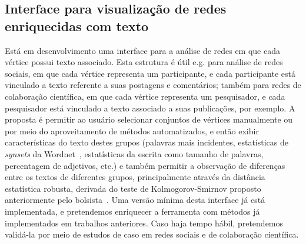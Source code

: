 \documentclass[a4paper, 11pt]{article}
\begin{document}
\subsection{Interface para visualização de redes enriquecidas com texto}
Está em desenvolvimento uma interface para a análise de redes em que cada vértice possui texto associado.
Esta estrutura é útil e.g. para análise de redes sociais, em que cada vértice representa um participante, e cada participante está vinculado a texto referente a suas postagens e comentários;
também para redes de colaboração científica, em que cada vértice representa um pesquisador, e cada pesquisador está vinculado a texto associado a suas publicações, por exemplo.
A proposta  é permitir ao usuário selecionar conjuntos de vértices manualmente ou por meio  do aproveitamento de métodos automatizados,
e então exibir características do texto destes grupos (palavras mais incidentes,
estatísticas de \emph{synsets} da Wordnet~\cite{wn}, estatísticas da escrita como tamanho de palavras, percentagem de adjetivos, etc.) e também permitir a observação de diferenças
entre os textos de diferentes grupos, principalmente através da distância estatística robusta, derivada do teste de Kolmogorov-Smirnov proposto anteriormente pelo bolsista~\cite{ks}.
Uma versão mínima desta interface já está implementada, e pretendemos enriquecer a ferramenta com métodos já implementados em trabalhos anteriores. Caso haja tempo hábil, pretendemos validá-la por meio de estudos de caso em redes sociais e de colaboração científica.
\end{document}
